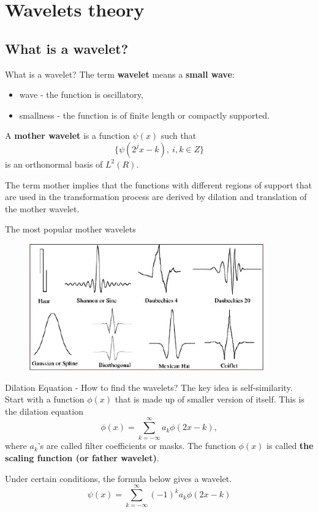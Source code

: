 \documentclass{beamer}
\newcommand{\1}[1]{\mathds{1}\left(#1\right)}
\begin{document}
\section{Wavelets theory}
\subsection{What is a wavelet?}
\begin{frame}{What is a wavelet?}
The term \textbf{wavelet} means a \textbf{small wave}:
\begin{itemize}
	\item wave - the function is oscillatory,
	\item smallness - the function is of finite length or compactly supported.
\end{itemize}


A \textbf{mother wavelet} is a function
$\psi(x)$ such that
$$\{\psi(2^jx - k),\ i, k \in Z\}$$
is an orthonormal basis of $L^2(R)$.

\begin{block}{}
The term mother implies that the functions with different regions of support that are used in the transformation process are derived by dilation and translation of the mother wavelet.
\end{block}
\end{frame}

\begin{frame}{The most popular mother wavelets}
	\begin{figure}[p]
		\centering
		\includegraphics[width=0.9\textwidth]{wavelet_samples.jpg}
	\end{figure}
\end{frame}


\begin{frame}{Dilation Equation - How to find the wavelets?}
The key idea is self-similarity. Start with a function
$\phi(x)$ that is made up of smaller version of itself. This is the dilation equation 
$$
\phi(x) = \sum_{k=-\infty}^{\infty} a_k \phi(2x - k),
$$
where $a_k$'s are called filter coefficients or masks. The function $\phi(x)$ is called \textbf{the scaling function (or father wavelet)}. 

Under certain conditions, the formula below gives a wavelet.
$$
\psi(x) = \sum_{k=-\infty}^{\infty} (-1)^k a_k \phi(2x - k)
$$
\end{frame}
\end{document}
